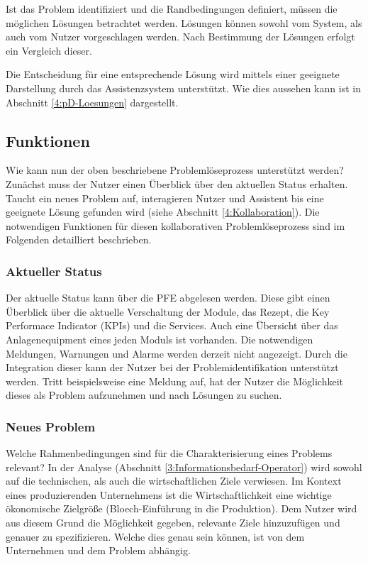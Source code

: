 Ist das Problem identifiziert und die Randbedingungen definiert, müssen die möglichen Lösungen betrachtet werden. Lösungen können sowohl vom System, als auch vom Nutzer vorgeschlagen werden. Nach Bestimmung der Lösungen erfolgt ein Vergleich dieser.

Die Entscheidung für eine entsprechende Lösung wird mittels einer geeignete Darstellung durch das Assistenzsystem unterstützt. Wie dies aussehen kann ist in Abschnitt \ref{4:pD-Loesungen} dargestellt.

\subsection{Funktionen}
Wie kann nun der oben beschriebene Problemlöseprozess unterstützt werden? Zunächst muss der Nutzer einen Überblick über den aktuellen Status erhalten. Taucht ein neues Problem auf, interagieren Nutzer und Assistent bis eine geeignete Lösung gefunden wird (siehe Abschnitt \ref{4:Kollaboration}). Die notwendigen Funktionen für diesen kollaborativen Problemlöseprozess sind im Folgenden detailliert beschrieben.

\subsubsection*{Aktueller Status}
Der aktuelle Status kann über die PFE abgelesen werden. Diese gibt einen Überblick über die aktuelle Verschaltung der Module, das Rezept, die Key Performace Indicator (KPIs) und die Services. Auch eine Übersicht über das Anlagenequipment eines jeden Moduls ist vorhanden. Die notwendigen Meldungen, Warnungen und Alarme werden derzeit  nicht angezeigt. Durch die Integration dieser kann der Nutzer bei der Problemidentifikation unterstützt werden. Tritt beispielsweise eine Meldung auf, hat der Nutzer die Möglichkeit dieses als Problem aufzunehmen und nach Lösungen zu suchen.

\subsubsection*{Neues Problem}
Welche Rahmenbedingungen sind für die Charakterisierung eines Problems relevant? In der Analyse (Abschnitt \ref{3:Informationsbedarf-Operator}) wird sowohl auf die technischen, als auch die wirtschaftlichen Ziele verwiesen. Im Kontext eines produzierenden Unternehmens ist die Wirtschaftlichkeit eine wichtige ökonomische Zielgröße \cite{} (Bloech-Einführung in die Produktion). Dem Nutzer wird aus diesem Grund die Möglichkeit gegeben, relevante Ziele hinzuzufügen und genauer zu spezifizieren. Welche dies genau sein können, ist von dem Unternehmen und dem Problem abhängig.

